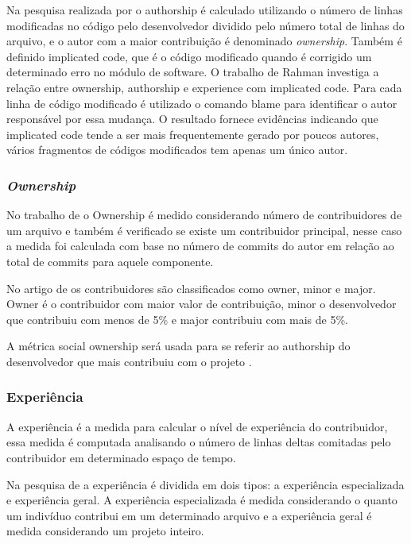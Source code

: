 Na pesquisa realizada por  o authorship é calculado utilizando o número de linhas modificadas no código pelo desenvolvedor dividido pelo número total de linhas do arquivo, e o autor com a maior contribuição é denominado \textit{ownership}. Também é definido implicated code, que é o código modificado quando é corrigido um determinado erro no módulo de software. O trabalho de Rahman investiga a relação entre ownership, authorship e experience com implicated code. Para cada linha de código modificado é utilizado o comando blame para identificar o autor responsável por essa mudança. O resultado fornece evidências indicando que implicated code tende a ser mais frequentemente gerado por poucos autores, vários fragmentos de códigos modificados tem apenas um único autor.

\subsubsection{\textit{Ownership}}
No trabalho de  o Ownership é medido considerando número de contribuidores de um arquivo e também é verificado se existe um contribuidor principal, nesse caso a medida foi calculada com base no número de commits do autor em relação ao total de commits para aquele componente.

No artigo de  os contribuidores são classificados como owner, minor e major. Owner é o contribuidor com maior valor de contribuição, minor o desenvolvedor que contribuiu com menos de 5\% e major contribuiu com mais de 5\%.

A métrica social ownership será usada para se referir ao authorship do desenvolvedor que mais contribuiu com o projeto \cite{Thongtanunam}. 

\subsubsection{Experiência}
A experiência é a medida para calcular o nível de experiência do contribuidor, essa medida é computada analisando o número de linhas \cite{Rahman2011} deltas comitadas pelo contribuidor em determinado espaço de tempo.

Na pesquisa de  a experiência é dividida em dois tipos: a experiência especializada e experiência geral. A experiência especializada é medida considerando o quanto um indivíduo contribui em um determinado arquivo e a experiência geral é medida considerando um projeto inteiro.

